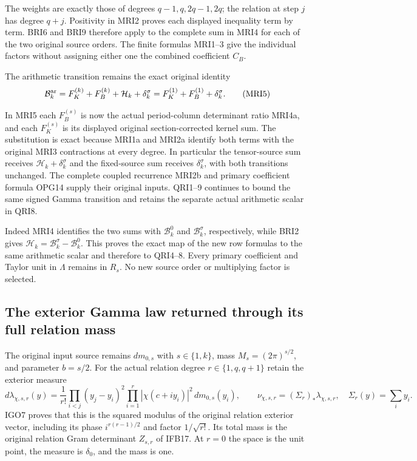 \documentclass[11pt,a4paper]{article}
\begin{document}
The weights are exactly those of degrees $q-1,q,2q-1,2q$;
the relation at step $j$ has degree $q+j$. Positivity in MRI2
proves each displayed inequality term by term. BRI6 and BRI9
therefore apply to the complete sum in MRI4 for each of the
two original source orders. The finite formulas MRI1--3 give
the individual factors without assigning either one the combined
coefficient $C_B$.

The arithmetic transition remains the exact original identity
\[
 \mathcal B_k^{\rm ar}
   =F_K^{(k)}+F_B^{(k)}+\mathcal H_k+\delta_k^\sigma
   =F_K^{(1)}+F_B^{(1)}+\delta_k^\sigma.
 \tag{MRI5}
\]

In MRI5 each $F_B^{(s)}$ is now the actual period-column determinant
ratio MRI4a, and each $F_K^{(s)}$ is its displayed original
section-corrected kernel sum. The substitution is exact because
MRI1a and MRI2a identify both terms with the original MRI3
contractions at every degree. In particular the tensor-source
sum receives $\mathcal H_k+\delta_k^\sigma$ and the fixed-source
sum receives $\delta_k^\sigma$, with both transitions unchanged.
The complete coupled recurrence MRI2b and primary coefficient
formula OPG14 supply their original inputs. QRI1--9 continues
to bound the same signed Gamma transition and retains the
separate actual arithmetic scalar in QRI8.

Indeed MRI4 identifies the two sums with $\mathcal B_k^0$ and
$\mathcal B_k^\sigma$, respectively, while BRI2 gives
$\mathcal H_k=\mathcal B_k^\sigma-\mathcal B_k^0$.
This proves the exact map of the new row formulas to the same
arithmetic scalar and therefore to QRI4--8. Every primary
coefficient and Taylor unit in $\Lambda$ remains in $R_s$.
No new source order or multiplying factor is selected.

\subsection{The exterior Gamma law returned through its full relation mass}

The original input source remains $dm_{0,s}$ with $s\in\{1,k\}$,
mass $M_s=(2\pi)^{s/2}$, and parameter $b=s/2$. For the actual
relation degree $r\in\{1,q,q+1\}$ retain the exterior measure
\[
 d\lambda_{\chi,s,r}(y)=\frac1{r!}
       \prod_{i<j}(y_j-y_i)^2
       \prod_{i=1}^r|\chi(c+iy_i)|^2\,dm_{0,s}(y_i),
 \qquad \nu_{\chi,s,r}=(\Sigma_r)_*\lambda_{\chi,s,r},
 \quad \Sigma_r(y)=\sum_i y_i.
 \tag{IRI1}
\]
IGO7 proves that this is the squared modulus of the original
relation exterior vector, including its phase
$i^{r(r-1)/2}$ and factor $1/\sqrt{r!}$. Its total mass is the
original relation Gram determinant $Z_{s,r}$ of IFB17. At $r=0$
the space is the unit point, the measure is $\delta_0$, and the
mass is one.
\end{document}
